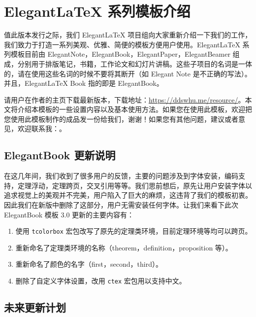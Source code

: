 \documentclass[titlestyle=hang,11pt]{elegantbook}
\author{ddswhu \& Liam Huang}
\begin{document}
\maketitle
\tableofcontents
\mainmatter
\chapter{Elegant\LaTeX{} 系列模板介绍}

值此版本发行之际，我们 Elegant\LaTeX{} 项目组向大家重新介绍一下我们的工作，我们致力于打造一系列美观、优雅、简便的模板方便用户使用。Elegant\LaTeX{} 系列模板目前由 ElegantNote，ElegantBook，ElegantPaper，ElegantBeamer 组成，分别用于排版笔记，书籍，工作论文和幻灯片讲稿。这些子项目的名词是一体的，请在使用这些名词的时候不要将其断开（如 Elegant Note 是不正确的写法）。并且，Elegant\LaTeX{}  Book 指的即是 ElegantBook。

请用户在作者的主页下载最新版本，下载地址：\href{https://ddswhu.me/resource/}{https://ddswhu.me/resource/}。本文将介绍本模板的一些设置内容以及基本使用方法。如果您在使用此模板，欢迎把您使用此模板制作的成品发一份给我们，谢谢！如果您有其他问题，建议或者意见，欢迎联系我：。


\section{ElegantBook 更新说明}
在这几年间，我们收到了很多用户的反馈，主要的问题涉及到字体安装，编码支持，定理浮动，定理跨页，交叉引用等等。我们思前想后，原先让用户安装字体以追求视觉上的美观并不完美，用户陷入了巨大的麻烦，这违背了我们的模板初衷。因此我们在新版中删除了这部分，用户无需安装任何字体。让我们来看下此次 ElegantBook 模板 3.0 更新的主要内容有：

\begin{enumerate}[noitemsep]
   \item 使用 \texttt{tcolorbox} 宏包改写了原先的定理类环境，目前定理环境等均可以跨页。
   \item 重新命名了定理类环境的名称（theorem，definition，proposition 等）。
   \item 重新命名了颜色的名字（first，second，third）。
   \item 删除了自定义字体设置，改用 \texttt{ctex} 宏包用以支持中文。
\end{enumerate}

\section{未来更新计划}
\end{document}
